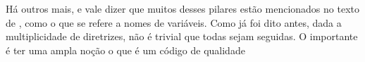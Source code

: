 Há outros mais, e vale dizer que muitos desses pilares estão mencionados no texto de \cite{CCL}, como o que se refere
a nomes de variáveis. Como já foi dito antes, dada a multiplicidade de diretrizes, não é trivial que todas sejam
seguidas. O importante é ter uma ampla noção o que é um código de qualidade